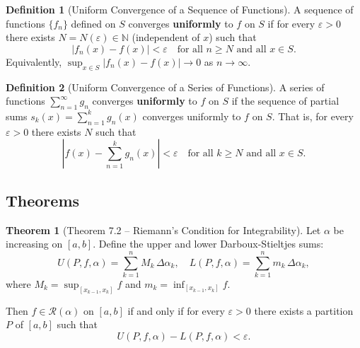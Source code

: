 \documentclass[12pt,a4paper]{article}
\theoremstyle{definition}
\newtheorem{definition}{Definition}[section]
\newtheorem{theorem}{Theorem}[section]
\newcommand{\N}{\mathbb{N}}
\newcommand{\eps}{\varepsilon}
\begin{document}
\begin{definition}[Uniform Convergence of a Sequence of Functions]
A sequence of functions $\{f_n\}$ defined on $S$ converges \textbf{uniformly} to $f$ on $S$ if for every $\eps > 0$ there exists $N = N(\eps) \in \N$ (independent of $x$) such that
\[
    |f_n(x) - f(x)| < \eps \quad \text{for all } n \geq N \text{ and all } x \in S.
\]
Equivalently, $\sup_{x \in S} |f_n(x) - f(x)| \to 0$ as $n \to \infty$.
\end{definition}

\begin{definition}[Uniform Convergence of a Series of Functions]
A series of functions $\sum_{n=1}^\infty g_n$ converges \textbf{uniformly} to $f$ on $S$ if the sequence of partial sums $s_k(x) = \sum_{n=1}^k g_n(x)$ converges uniformly to $f$ on $S$. That is, for every $\eps > 0$ there exists $N$ such that
\[
    \left|f(x) - \sum_{n=1}^k g_n(x)\right| < \eps \quad \text{for all } k \geq N \text{ and all } x \in S.
\]
\end{definition}

\subsection{Theorems}

\begin{theorem}[Theorem 7.2 -- Riemann's Condition for Integrability]
Let $\alpha$ be increasing on $[a,b]$. Define the upper and lower Darboux-Stieltjes sums:
\[
    U(P, f, \alpha) = \sum_{k=1}^n M_k \,\Delta\alpha_k, \quad L(P, f, \alpha) = \sum_{k=1}^n m_k \,\Delta\alpha_k,
\]
where $M_k = \sup_{[x_{k-1}, x_k]} f$ and $m_k = \inf_{[x_{k-1}, x_k]} f$.

Then $f \in \mathcal{R}(\alpha)$ on $[a,b]$ if and only if for every $\eps > 0$ there exists a partition $P$ of $[a,b]$ such that
\[
    U(P, f, \alpha) - L(P, f, \alpha) < \eps.
\]
\end{theorem}
\end{document}
